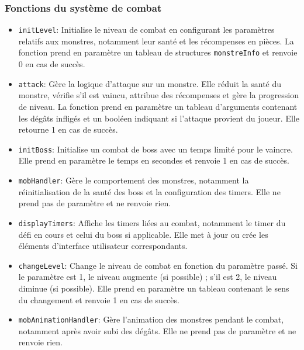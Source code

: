 \documentclass[11pt,a4paper]{article}
\begin{document}
\subsubsection{Fonctions du système de combat}
\begin{itemize}
    \item \texttt{initLevel}: Initialise le niveau de combat en configurant les paramètres relatifs aux monstres, notamment leur santé et les récompenses en pièces. La fonction prend en paramètre un tableau de structures \texttt{monstreInfo} et renvoie 0 en cas de succès.
    \item \texttt{attack}: Gère la logique d'attaque sur un monstre. Elle réduit la santé du monstre, vérifie s'il est vaincu, attribue des récompenses et gère la progression de niveau. La fonction prend en paramètre un tableau d'arguments contenant les dégâts infligés et un booléen indiquant si l'attaque provient du joueur. Elle retourne 1 en cas de succès.
    \item \texttt{initBoss}: Initialise un combat de boss avec un temps limité pour le vaincre. Elle prend en paramètre le temps en secondes et renvoie 1 en cas de succès.
    \item \texttt{mobHandler}: Gère le comportement des monstres, notamment la réinitialisation de la santé des boss et la configuration des timers. Elle ne prend pas de paramètre et ne renvoie rien.
    \item \texttt{displayTimers}: Affiche les timers liées au combat, notamment le timer du défi en cours et celui du boss si applicable. Elle met à jour ou crée les éléments d'interface utilisateur correspondants.
    \item \texttt{changeLevel}: Change le niveau de combat en fonction du paramètre passé. Si le paramètre est 1, le niveau augmente (si possible) ; s'il est 2, le niveau diminue (si possible). Elle prend en paramètre un tableau contenant le sens du changement et renvoie 1 en cas de succès.
    \item \texttt{mobAnimationHandler}: Gère l'animation des monstres pendant le combat, notamment après avoir subi des dégâts. Elle ne prend pas de paramètre et ne renvoie rien.
\end{itemize}
\end{document}
